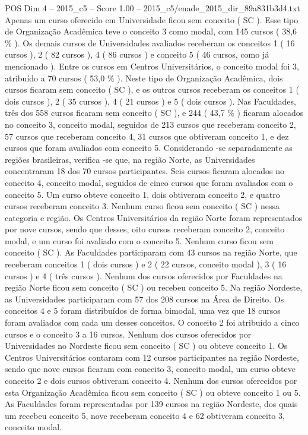 \begin{textsample}{POS Dim 4 – 2015\_c5 – Score 1.00 – 2015\_c5/enade\_2015\_dir\_89a831b3d4.txt}
Apenas um curso oferecido em Universidade ficou sem conceito ( SC ).
Esse tipo de Organização Acadêmica teve o conceito 3 como modal, com 145 cursos ( 38,6 \% ).
Os demais cursos de Universidades avaliados receberam os conceitos 1 ( 16 cursos ), 2 ( 82 cursos ), 4 ( 86 cursos ) e conceito 5 ( 46 cursos, como já mencionado ).
Entre os cursos em Centros Universitários, o conceito modal foi 3, atribuído a 70 cursos ( 53,0 \% ).
Neste tipo de Organização Acadêmica, dois cursos ficaram sem conceito ( SC ), e os outros cursos receberam os conceitos 1 ( dois cursos ), 2 ( 35 cursos ), 4 ( 21 cursos ) e 5 ( dois cursos ).
Nas Faculdades, três dos 558 cursos ficaram sem conceito ( SC ), e 244 ( 43,7 \% ) ficaram alocados no conceito 3, conceito modal, seguidos de 213 cursos que receberam conceito 2, 57 cursos que receberam conceito 4, 31 cursos que obtiveram conceito 1, e dez cursos que foram avaliados com conceito 5.
Considerando -se separadamente as regiões brasileiras, verifica -se que, na região Norte, as Universidades concentraram 18 dos 70 cursos participantes.
Seis cursos ficaram alocados no conceito 4, conceito modal, seguidos de cinco cursos que foram avaliados com o conceito 5.
Um curso obteve conceito 1, dois obtiveram conceito 2, e quatro cursos receberam conceito 3.
Nenhum curso ficou sem conceito ( SC ) nessa categoria e região.
Os Centros Universitários da região Norte foram representados por nove cursos, sendo que desses, oito cursos receberam conceito 2, conceito modal, e um curso foi avaliado com o conceito 5.
Nenhum curso ficou sem conceito ( SC ).
As Faculdades participaram com 43 cursos na região Norte, que receberam conceitos 1 ( dois cursos ) e 2 ( 22 cursos, conceito modal ), 3 ( 16 cursos ) e 4 ( três cursos ).
Nenhum dos cursos oferecidos por Faculdades na região Norte ficou sem conceito ( SC ) ou recebeu conceito 5.
Na região Nordeste, as Universidades participaram com 57 dos 208 cursos na Área de Direito.
Os conceitos 4 e 5 foram distribuídos de forma bimodal, uma vez que 18 cursos foram avaliados com cada um desses conceitos.
O conceito 2 foi atribuído a cinco cursos e o conceito 3 a 16 cursos.
Nenhum dos cursos oferecidos por Universidades no Nordeste ficou sem conceito ( SC ) ou obteve conceito 1.
Os Centros Universitários contaram com 12 cursos participantes na região Nordeste, sendo que nove cursos ficaram com conceito 3, conceito modal, um curso obteve conceito 2 e dois cursos obtiveram conceito 4.
Nenhum dos cursos oferecidos por esta Organização Acadêmica ficou sem conceito ( SC ) ou obteve conceito 1 ou 5.
As Faculdades foram representadas por 139 cursos na região Nordeste, dos quais um recebeu conceito 5, nove receberam conceito 4 e 62 obtiveram conceito 3, conceito modal.

\end{textsample}
